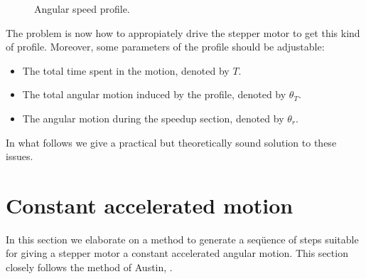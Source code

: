 \documentclass[a4paper]{article}
\begin{document}
\begin{figure}[tb]
  \centering
  \label{fig:profile}
  \caption{Angular speed profile.}
\end{figure}

The problem is now how to appropiately drive the stepper motor to get
this kind of profile. Moreover, some parameters of the profile should
be adjustable:
\begin{itemize}
\item The total time spent in the motion, denoted by $T$.
\item The total angular motion induced by the profile, denoted by
  $\theta_T$.
\item The angular motion during the speedup section, denoted by $\theta_r$.
\end{itemize}
In what follows we give a practical but theoretically sound solution
to these issues.


\section{Constant accelerated motion}
\label{sec:const-accel-moti}

In this section we elaborate on a method to generate a seqüence of
steps suitable for giving a stepper motor a constant accelerated
angular motion. This section closely follows the method of Austin,
\cite{austin05:_gener}.
\end{document}
